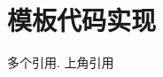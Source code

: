 \documentclass[master,openright,twoside,color,AutoFakeBold=true]{misc/buaathesis}
\begin{document}
  \mainmatter
  \pagestyle{mainmatter}
\fi

\chapter{模板代码实现}
多个引用\cite{idlemem,sigsegv,ulk3rd,ldd3rd,GMM,nrd,1992GMM}. 
上角引用

\ifdefined\maindoc
\else
  
  
\end{document}
